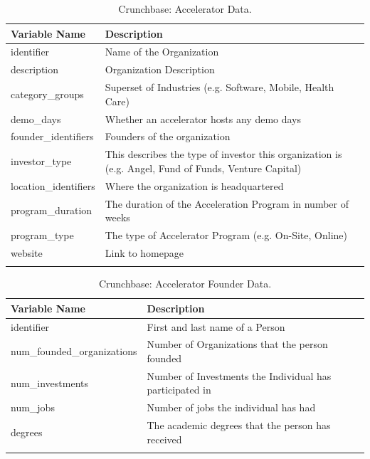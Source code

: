 \documentclass[
  12pt,
]{article}
\begin{document}
\begin{table}[H]

\caption{\label{tab:crunchaccelerator}Crunchbase: Accelerator Data.}
\centering
\fontsize{9}{11}\selectfont
\begin{tabu} to 
\toprule
Variable Name & Description\\
\midrule
identifier & Name of the Organization\\
\addlinespace
description & Organization Description\\
\addlinespace
category\_groups & Superset of Industries (e.g. Software, Mobile, Health Care)\\
\addlinespace
demo\_days & Whether an accelerator hosts any demo days\\
\addlinespace
founder\_identifiers & Founders of the organization\\
\addlinespace
investor\_type & This describes the type of investor this organization is (e.g. Angel, Fund of Funds, Venture Capital)\\
\addlinespace
location\_identifiers & Where the organization is headquartered\\
\addlinespace
program\_duration & The duration of the Acceleration Program in number of weeks\\
\addlinespace
program\_type & The type of Accelerator Program (e.g. On-Site, Online)\\
\addlinespace
website & Link to homepage\\
\bottomrule
{}\\
\end{tabu}
\end{table}

\begin{table}[H]

\caption{\label{tab:crunchacceleratorfounder}Crunchbase: Accelerator Founder Data.}
\centering
\fontsize{9}{11}\selectfont
\begin{tabu} to 
\toprule
Variable Name & Description\\
\midrule
identifier & First and last name of a Person\\
\addlinespace
num\_founded\_organizations & Number of Organizations that the person founded\\
\addlinespace
num\_investments & Number of Investments the Individual has participated in\\
\addlinespace
num\_jobs & Number of jobs the individual has had\\
\addlinespace
degrees & The academic degrees that the person has received\\
\bottomrule
{}\\
\end{tabu}
\end{table}
\end{document}
